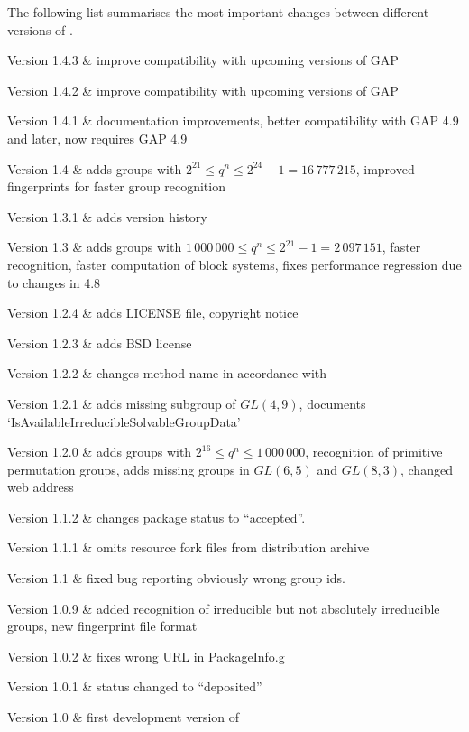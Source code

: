 
The following list summarises the most important changes between different versions of \IRREDSOL.

\beginitems
Version 1.4.3 &
	improve compatibility with upcoming versions of GAP
	
Version 1.4.2 &
	improve compatibility with upcoming versions of GAP

Version 1.4.1 &
	documentation improvements, better compatibility with GAP 4.9 and later, now requires GAP 4.9

Version 1.4 &
	adds groups with $2^{21} \leq q^n \leq 2^{24} - 1 = 16\,777\,215$, improved fingerprints for faster
	group recognition

Version 1.3.1 &
	adds version history
	
Version 1.3 &
	adds groups with $1\,000\,000 \leq q^n \leq 2^{21} - 1 = 2\,097\,151$, faster recognition, faster computation of block systems, fixes performance regression due to changes in {\GAP} 4.8
	
Version 1.2.4 &
	adds LICENSE file, copyright notice
	
Version 1.2.3 & 
	adds BSD license
	
Version 1.2.2 &
	changes method name in accordance with {\GAP}
	
Version 1.2.1 &
	adds missing subgroup of $GL(4,9)$, documents `IsAvailableIrreducibleSolvableGroupData'
	
Version 1.2.0 &
	adds groups with $2^{16} \leq q^n \leq 1\,000\,000$, recognition of primitive permutation groups, adds missing groups in $GL(6,5)$ and $GL(8,3)$, changed web address

Version 1.1.2 &
	changes package status to ``accepted''.
	
Version 1.1.1 & 
	omits resource fork files from distribution archive
	
Version 1.1 &
	fixed bug reporting obviously wrong group ids.
	
Version 1.0.9 & 
	added recognition of irreducible but not absolutely irreducible groups, new fingerprint file format
	
Version 1.0.2 & 
	fixes wrong URL in PackageInfo.g
	
Version 1.0.1 &
	status changed to ``deposited''
	
Version 1.0 &
 	first development version of {\IRREDSOL}
	
\enditems

